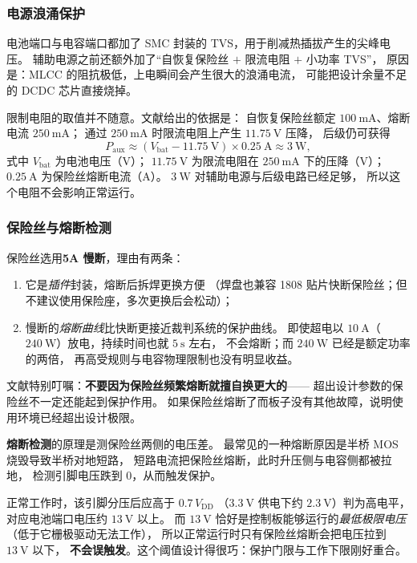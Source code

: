 \documentclass[cn,blue,11pt,device=normal]{elegantnote}
\begin{document}
\subsubsection{电源浪涌保护}

电池端口与电容端口都加了 SMC 封装的 TVS，用于削减热插拔产生的尖峰电压。
辅助电源之前还额外加了“自恢复保险丝 $+$ 限流电阻 $+$ 小功率 TVS”，
原因是：MLCC 的阻抗极低，上电瞬间会产生很大的浪涌电流，
可能把设计余量不足的 DCDC 芯片直接烧掉。

限制电阻的取值并不随意。文献给出的依据是：
自恢复保险丝额定 $100\ \mathrm{mA}$、熔断电流 $250\ \mathrm{mA}$；
通过 $250\ \mathrm{mA}$ 时限流电阻上产生 $11.75\ \mathrm{V}$ 压降，
后级仍可获得
\begin{equation}\label{eq:auxpower}
  P_{\mathrm{aux}} \approx (V_{\mathrm{bat}} - 11.75\ \mathrm{V})\times 0.25\ \mathrm{A}
  \approx 3\ \mathrm{W},
\end{equation}
式中 $V_{\mathrm{bat}}$ 为电池电压（V）；
$11.75\ \mathrm{V}$ 为限流电阻在 $250\ \mathrm{mA}$ 下的压降（V）；
$0.25\ \mathrm{A}$ 为保险丝熔断电流（A）。
$3\ \mathrm{W}$ 对辅助电源与后级电路已经足够，
所以这个电阻不会影响正常运行。

\subsubsection{保险丝与熔断检测}

保险丝选用\textbf{5A 慢断}，理由有两条：

\begin{enumerate}
  \item 它是\emph{插件}封装，熔断后拆焊更换方便
  （焊盘也兼容 1808 贴片快断保险丝；但不建议使用保险座，多次更换后会松动）；
  \item 慢断的\emph{熔断曲线}比快断更接近裁判系统的保护曲线。
  即使超电以 $10\ \mathrm{A}$（$240\ \mathrm{W}$）放电，持续时间也就 $5\ \mathrm{s}$ 左右，
  不会熔断；而 $240\ \mathrm{W}$ 已经是额定功率的两倍，
  再高受规则与电容物理限制也没有明显收益。
\end{enumerate}

文献特别叮嘱：\textbf{不要因为保险丝频繁熔断就擅自换更大的}——
超出设计参数的保险丝不一定还能起到保护作用。
如果保险丝熔断了而板子没有其他故障，说明使用环境已经超出设计极限。

\textbf{熔断检测}的原理是测保险丝两侧的电压差。
最常见的一种熔断原因是半桥 MOS 烧毁导致半桥对地短路，
短路电流把保险丝熔断，此时升压侧与电容侧都被拉地，
检测引脚电压跌到 0，从而触发保护。

正常工作时，该引脚分压后应高于 $0.7\,V_{\mathrm{DD}}$
（$3.3\ \mathrm{V}$ 供电下约 $2.3\ \mathrm{V}$）判为高电平，
对应电池端口电压约 $13\ \mathrm{V}$ 以上。
而 $13\ \mathrm{V}$ 恰好是控制板能够运行的\emph{最低极限电压}
（低于它栅极驱动无法工作），
所以正常运行时只有保险丝熔断会把电压拉到 $13\ \mathrm{V}$ 以下，
\textbf{不会误触发}。这个阈值设计得很巧：保护门限与工作下限刚好重合。
\end{document}
